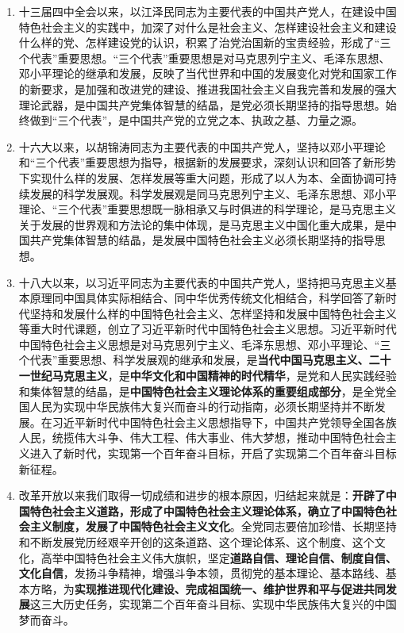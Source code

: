 \documentclass[UTF8,11pt,a4paper]{ctexart}
\begin{document}
\begin{enumerate}[label=\arabic*., leftmargin=2.3em]
\item 十三届四中全会以来，以江泽民同志为主要代表的中国共产党人，在建设中国特色社会主义的实践中，加深了对什么是社会主义、怎样建设社会主义和建设什么样的党、怎样建设党的认识，积累了治党治国新的宝贵经验，形成了“三个代表”重要思想。“三个代表”重要思想是对马克思列宁主义、毛泽东思想、邓小平理论的继承和发展，反映了当代世界和中国的发展变化对党和国家工作的新要求，是加强和改进党的建设、推进我国社会主义自我完善和发展的强大理论武器，是中国共产党集体智慧的结晶，是党必须长期坚持的指导思想。始终做到“三个代表”，是中国共产党的立党之本、执政之基、力量之源。
\item 十六大以来，以胡锦涛同志为主要代表的中国共产党人，坚持以邓小平理论和“三个代表”重要思想为指导，根据新的发展要求，深刻认识和回答了新形势下实现什么样的发展、怎样发展等重大问题，形成了以人为本、全面协调可持续发展的科学发展观。科学发展观是同马克思列宁主义、毛泽东思想、邓小平理论、“三个代表”重要思想既一脉相承又与时俱进的科学理论，是马克思主义关于发展的世界观和方法论的集中体现，是马克思主义中国化重大成果，是中国共产党集体智慧的结晶，是发展中国特色社会主义必须长期坚持的指导思想。
\item 十八大以来，以习近平同志为主要代表的中国共产党人，坚持把马克思主义基本原理同中国具体实际相结合、同中华优秀传统文化相结合，科学回答了新时代坚持和发展什么样的中国特色社会主义、怎样坚持和发展中国特色社会主义等重大时代课题，创立了习近平新时代中国特色社会主义思想。习近平新时代中国特色社会主义思想是对马克思列宁主义、毛泽东思想、邓小平理论、“三个代表”重要思想、科学发展观的继承和发展，是\textbf{当代中国马克思主义、二十一世纪马克思主义}，是\textbf{中华文化和中国精神的时代精华}，是党和人民实践经验和集体智慧的结晶，是\textbf{中国特色社会主义理论体系的重要组成部分}，是全党全国人民为实现中华民族伟大复兴而奋斗的行动指南，必须长期坚持并不断发展。在习近平新时代中国特色社会主义思想指导下，中国共产党领导全国各族人民，统揽伟大斗争、伟大工程、伟大事业、伟大梦想，推动中国特色社会主义进入了新时代，实现第一个百年奋斗目标，开启了实现第二个百年奋斗目标新征程。
\item 改革开放以来我们取得一切成绩和进步的根本原因，归结起来就是：\textbf{开辟了中国特色社会主义道路，形成了中国特色社会主义理论体系，确立了中国特色社会主义制度，发展了中国特色社会主义文化}。全党同志要倍加珍惜、长期坚持和不断发展党历经艰辛开创的这条道路、这个理论体系、这个制度、这个文化，高举中国特色社会主义伟大旗帜，坚定\textbf{道路自信、理论自信、制度自信、文化自信}，发扬斗争精神，增强斗争本领，贯彻党的基本理论、基本路线、基本方略，为\textbf{实现推进现代化建设、完成祖国统一、维护世界和平与促进共同发展}这三大历史任务，实现第二个百年奋斗目标、实现中华民族伟大复兴的中国梦而奋斗。

\end{enumerate}
\end{document}
